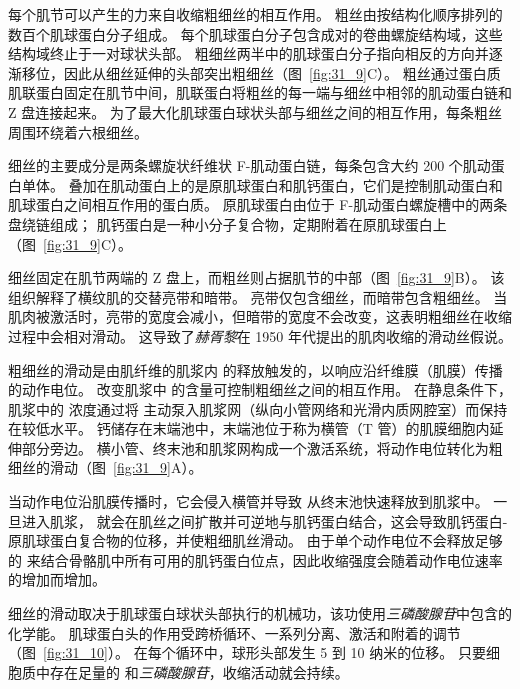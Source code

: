 每个肌节可以产生的力来自收缩粗细丝的相互作用。
粗丝由按结构化顺序排列的数百个肌球蛋白分子组成。
每个肌球蛋白分子包含成对的卷曲螺旋结构域，这些结构域终止于一对球状头部。
粗细丝两半中的肌球蛋白分子指向相反的方向并逐渐移位，因此从细丝延伸的头部突出粗细丝（图~\ref{fig:31_9}C）。
粗丝通过蛋白质肌联蛋白固定在肌节中间，肌联蛋白将粗丝的每一端与细丝中相邻的肌动蛋白链和 Z 盘连接起来。
为了最大化肌球蛋白球状头部与细丝之间的相互作用，每条粗丝周围环绕着六根细丝。


细丝的主要成分是两条螺旋状纤维状 F-肌动蛋白链，每条包含大约 200 个肌动蛋白单体。
叠加在肌动蛋白上的是原肌球蛋白和肌钙蛋白，它们是控制肌动蛋白和肌球蛋白之间相互作用的蛋白质。
原肌球蛋白由位于 F-肌动蛋白螺旋槽中的两条盘绕链组成；
肌钙蛋白是一种小分子复合物，定期附着在原肌球蛋白上（图~\ref{fig:31_9}C）。


细丝固定在肌节两端的 Z 盘上，而粗丝则占据肌节的中部（图~\ref{fig:31_9}B）。
该组织解释了横纹肌的交替亮带和暗带。
亮带仅包含细丝，而暗带包含粗细丝。
当肌肉被激活时，亮带的宽度会减小，但暗带的宽度不会改变，这表明粗细丝在收缩过程中会相对滑动。
这导致了\textit{赫胥黎}在 1950 年代提出的肌肉收缩的滑动丝假说。


粗细丝的滑动是由肌纤维的肌浆内  的释放触发的，以响应沿纤维膜（肌膜）传播的动作电位。
改变肌浆中  的含量可控制粗细丝之间的相互作用。
在静息条件下，肌浆中的  浓度通过将  主动泵入肌浆网（纵向小管网络和光滑内质网腔室）而保持在较低水平。
钙储存在末端池中，末端池位于称为横管（T 管）的肌膜细胞内延伸部分旁边。
横小管、终末池和肌浆网构成一个激活系统，将动作电位转化为粗细丝的滑动（图~\ref{fig:31_9}A）。


当动作电位沿肌膜传播时，它会侵入横管并导致  从终末池快速释放到肌浆中。
一旦进入肌浆， 就会在肌丝之间扩散并可逆地与肌钙蛋白结合，这会导致肌钙蛋白-原肌球蛋白复合物的位移，并使粗细肌丝滑动。
由于单个动作电位不会释放足够的  来结合骨骼肌中所有可用的肌钙蛋白位点，因此收缩强度会随着动作电位速率的增加而增加。


细丝的滑动取决于肌球蛋白球状头部执行的机械功，该功使用\textit{三磷酸腺苷}中包含的化学能。
肌球蛋白头的作用受跨桥循环、一系列分离、激活和附着的调节（图~\ref{fig:31_10}）。
在每个循环中，球形头部发生 5 到 10 纳米的位移。
只要细胞质中存在足量的 和\textit{三磷酸腺苷}，收缩活动就会持续。


